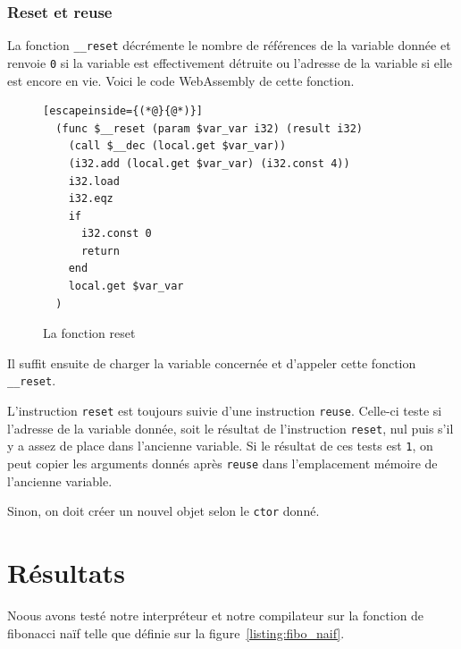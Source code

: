 \documentclass{rapportECL}
\begin{document}
\subsubsection{Reset et reuse}

La fonction \verb|__reset| décrémente le nombre de références de la variable donnée et renvoie \verb|0| si la variable est effectivement détruite ou l'adresse de la variable si elle est encore en vie. Voici le code WebAssembly de cette fonction.

\begin{figure}[H]
	\begin{lstlisting}[escapeinside={(*@}{@*)}]
  (func $__reset (param $var_var i32) (result i32)
    (call $__dec (local.get $var_var))
    (i32.add (local.get $var_var) (i32.const 4))
    i32.load
    i32.eqz
    if
      i32.const 0
      return
    end
    local.get $var_var
  )
	\end{lstlisting}
	\caption{La fonction reset}
	\label{listing:compile_reset}
\end{figure}

Il suffit ensuite de charger la variable concernée et d'appeler cette fonction \verb|__reset|.

\medskip

L'instruction \verb|reset| est toujours suivie d'une instruction \verb|reuse|. Celle-ci teste si l'adresse de la variable donnée, 
soit le résultat de l'instruction \verb|reset|, nul puis s'il y a assez de place dans l'ancienne variable. Si le résultat de ces
tests est \verb|1|, on peut copier les arguments donnés après \verb|reuse| dans l'emplacement mémoire de l'ancienne variable.

Sinon, on doit créer un nouvel objet selon le \verb|ctor| donné.

\section{Résultats}

Noous avons testé notre interpréteur et notre compilateur sur la fonction de fibonacci naïf telle que définie sur la figure~\ref{listing:fibo_naif}.
\end{document}

